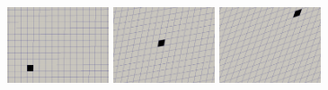 \begin{center}
\includegraphics[width=3cm]{python_codes/fieldstone_89/results/pureshear/target0000}
\includegraphics[width=3cm]{python_codes/fieldstone_89/results/pureshear/target0005}
\includegraphics[width=3cm]{python_codes/fieldstone_89/results/pureshear/target0010}
\end{center}


